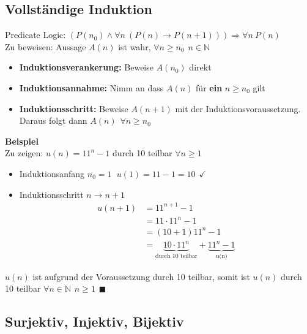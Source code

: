 \documentclass[8pt, a4paper, landscape, fleqn]{scrartcl}
\newenvironment {example}
				{\begin{itshape} \begin{small}}
				{\end{small} \end{itshape}}
\begin{document}
\begin{multicols*}{3}
			\subsection{Vollständige Induktion}
				Predicate Logic: $(P(n_0) \land \forall n\ (P(n) \rightarrow P(n+1))) \Rightarrow \forall n\ P(n)$ \\
				Zu beweisen: Aussage $A(n)$ ist wahr,  $\forall n\geq n_0 \hspace{5pt} n\in \mathbb{N}$
				\begin{itemize}
					\item \textbf{Induktionsverankerung:} Beweise $A(n_0)$ direkt
					\item \textbf{Induktionsannahme:} Nimm an dass $A(n)$ für \textbf{ein} $n\geq n_0$ gilt
					\item \textbf{Induktionsschritt:} Beweise $A(n+1)$ mit der Induktionsvoraussetzung. Daraus folgt dann $A(n) \hspace{5pt}$$\forall n\geq n_0$
				\end{itemize}
				\begin{example}
					\textbf{Beispiel}\\
					Zu zeigen: $u(n)=11^n-1$ durch 10 teilbar $\forall n\geq 1$
					\begin{itemize}
						\item Induktionsanfang $n_0=1 \hspace{7pt} u(1)=11-1=10\hspace{5pt}\checkmark$	
						\item Induktionsschritt $n\rightarrow n+1$
						\begin{align*}
							u(n+1)	&=11^{n+1}-1\\
									&=11\cdot 11^n-1\\
									&=(10+1)11^n-1\\
									&=\underbrace{10\cdot 11^n}_{\text{durch 10 teilbar}}+\underbrace{11^n-1}_{\text{u(n)}}
						\end{align*}
					\end{itemize}
					$u(n)$ ist aufgrund der Voraussetzung durch 10 teilbar, somit ist $u(n)$ durch 10 teilbar $\forall n\in\mathbb{N}\hspace{5pt} n\geq 1  \hspace{5pt}\blacksquare$	
				\end{example}
				
			\subsection{Surjektiv, Injektiv, Bijektiv}
			    \begin{minipage}{6.5cm}

\end{minipage}
\end{multicols*}
\end{document}

